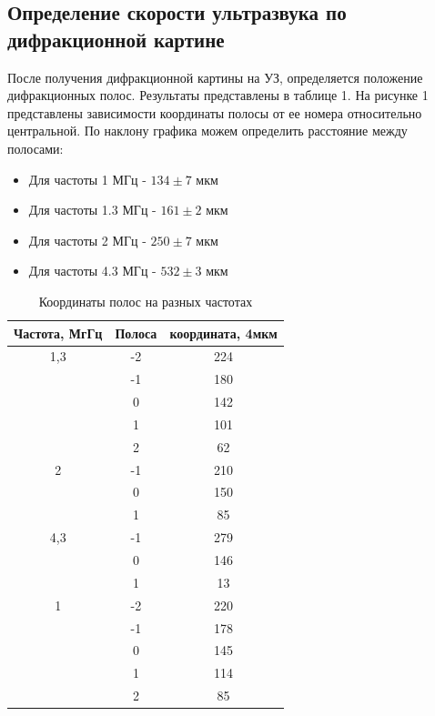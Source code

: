 \documentclass[a4paper, 12pt]{article}
\begin{document}
\subsection{Определение скорости ультразвука по дифракционной картине}
После получения дифракционной картины на УЗ, определяется положение дифракционных полос. Результаты представлены в таблице 1. На рисунке 1 представлены зависимости координаты полосы от ее номера относительно центральной. По наклону графика можем определить расстояние между полосами:
\begin{itemize}
    \item Для частоты 1 МГц - $134 \pm 7$ мкм
    \item Для частоты 1.3 МГц - $161 \pm 2$ мкм
    \item Для частоты 2 МГц - $250 \pm 7$ мкм
    \item Для частоты 4.3 МГц - $532 \pm 3$ мкм
\end{itemize}
\begin{table}[h]
\begin{center}
\caption{Координаты полос на разных частотах}
\begin{tabular}{|c|c|c|}
\hline
Частота, МгГц        & Полоса & координата, 4мкм \\ \hline
\multirow{}{}{1,3} & -2     & 224              \\ \cline{2-3} 
                     & -1     & 180              \\ \cline{2-3} 
                     & 0      & 142              \\ \cline{2-3} 
                     & 1      & 101              \\ \cline{2-3} 
                     & 2      & 62               \\ \hline
\multirow{}{}{2}   & -1     & 210              \\ \cline{2-3} 
                     & 0      & 150              \\ \cline{2-3} 
                     & 1      & 85               \\ \hline
\multirow{}{}{4,3} & -1     & 279              \\ \cline{2-3} 
                     & 0      & 146              \\ \cline{2-3} 
                     & 1      & 13               \\ \hline
\multirow{}{}{1}   & -2     & 220              \\ \cline{2-3} 
                     & -1     & 178              \\ \cline{2-3} 
                     & 0      & 145              \\ \cline{2-3} 
                     & 1      & 114              \\ \cline{2-3} 
                     & 2      & 85               \\ \hline
\end{tabular}
\end{center}
\end{table}
\end{document}
